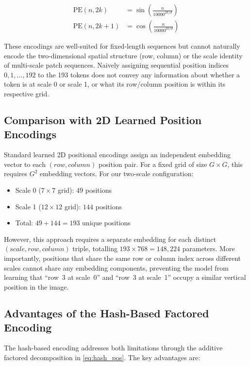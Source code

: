 \begin{align}
    \text{PE}(n, 2k)   &= \sin\!\left(\frac{n}{10000^{2k/d}}\right) \\
    \text{PE}(n, 2k+1) &= \cos\!\left(\frac{n}{10000^{2k/d}}\right)
\end{align}

These encodings are well-suited for fixed-length sequences but cannot naturally encode
the two-dimensional spatial structure (row, column) or the scale identity of multi-scale
patch sequences. Naively assigning sequential position indices $0, 1, \ldots, 192$ to
the 193 tokens does not convey any information about whether a token is at scale 0 or
scale 1, or what its row/column position is within its respective grid.

\subsection{Comparison with 2D Learned Position Encodings}

Standard learned 2D positional encodings assign an independent embedding vector to each
$(row, column)$ position pair. For a fixed grid of size $G \times G$, this requires
$G^2$ embedding vectors. For our two-scale configuration:
\begin{itemize}
    \item Scale 0 ($7 \times 7$ grid): $49$ positions
    \item Scale 1 ($12 \times 12$ grid): $144$ positions
    \item Total: $49 + 144 = 193$ unique positions
\end{itemize}

However, this approach requires a separate embedding for each distinct $(scale, row,
column)$ triple, totalling $193 \times 768 = 148{,}224$ parameters. More importantly,
positions that share the same row or column index across different scales cannot share
any embedding components, preventing the model from learning that ``row~3 at scale~0''
and ``row~3 at scale~1'' occupy a similar vertical position in the image.

\subsection{Advantages of the Hash-Based Factored Encoding}

The hash-based encoding addresses both limitations through the additive factored
decomposition in \cref{eq:hash_pos}. The key advantages are:

